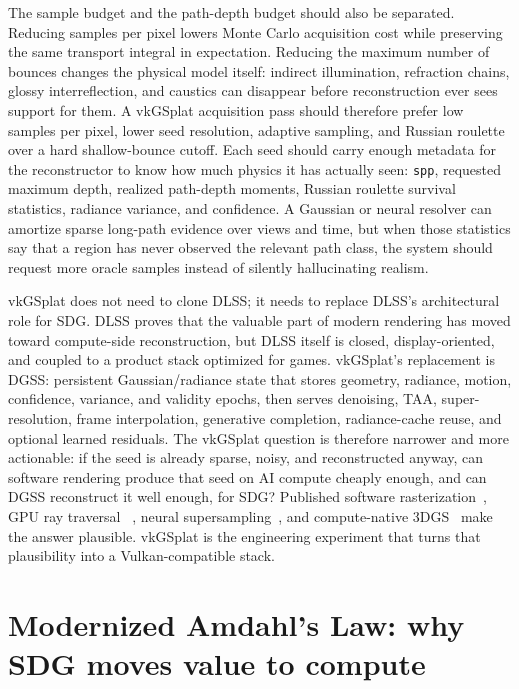 \documentclass[10pt,journal,onecolumn]{IEEEtran}
\begin{document}
The sample budget and the path-depth budget should also be separated. Reducing
samples per pixel lowers Monte Carlo acquisition cost while preserving the same
transport integral in expectation. Reducing the maximum number of bounces changes
the physical model itself: indirect illumination, refraction chains, glossy
interreflection, and caustics can disappear before reconstruction ever sees
support for them. A vkGSplat acquisition pass should therefore prefer low
samples per pixel, lower seed resolution, adaptive sampling, and Russian
roulette over a hard shallow-bounce cutoff. Each seed should carry enough
metadata for the reconstructor to know how much physics it has actually seen:
\texttt{spp}, requested maximum depth, realized path-depth moments, Russian
roulette survival statistics, radiance variance, and confidence. A Gaussian or
neural resolver can amortize sparse long-path evidence over views and time, but
when those statistics say that a region has never observed the relevant path
class, the system should request more oracle samples instead of silently
hallucinating realism.

vkGSplat does not need to clone DLSS; it needs to replace DLSS's architectural
role for SDG. DLSS proves that the valuable part of modern rendering has moved
toward compute-side reconstruction, but DLSS itself is closed, display-oriented,
and coupled to a product stack optimized for games. vkGSplat's replacement is
DGSS: persistent Gaussian/radiance state that stores geometry, radiance, motion,
confidence, variance, and validity epochs, then serves denoising, TAA,
super-resolution, frame interpolation, generative completion, radiance-cache
reuse, and optional learned residuals. The vkGSplat question is therefore
narrower and more actionable: if the seed is already sparse, noisy, and
reconstructed anyway, can software rendering produce that seed on AI compute
cheaply enough, and can DGSS reconstruct it well enough, for SDG? Published software
rasterization~\cite{laine2011software}, GPU ray traversal
~\cite{aila2009understanding}, neural supersampling~\cite{xiao2020}, and
compute-native 3DGS~\cite{kerbl20233dgs} make the answer plausible. vkGSplat is
the engineering experiment that turns that plausibility into a
Vulkan-compatible stack.

\section{Modernized Amdahl's Law: why SDG moves value to compute}
\label{sec:amdahl-main}
\end{document}
